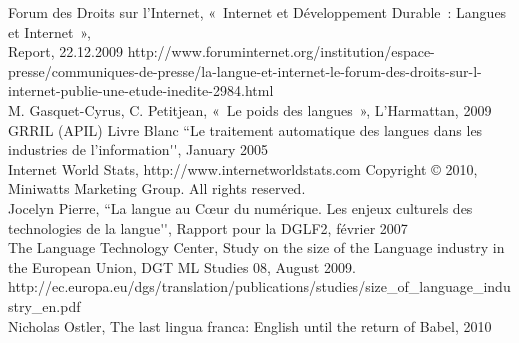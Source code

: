 Forum des Droits sur l’Internet, «~Internet et Développement Durable~: Langues et Internet~»,\\
Report, 22.12.2009 http://www.foruminternet.org/institution/espace-presse/communiques-de-presse/la-langue-et-internet-le-forum-des-droits-sur-l-internet-publie-une-etude-inedite-2984.html\\


M. Gasquet-Cyrus, C. Petitjean, «~Le poids des langues~», L’Harmattan, 2009\\

GRRIL (APIL) Livre Blanc ``Le traitement automatique des langues dans les industries de l’information{\mbox '}{\mbox '}, January 2005\\

Internet World Stats, http://www.internetworldstats.com Copyright © 2010, Miniwatts Marketing Group. All rights reserved.\\

Jocelyn Pierre, ``La langue au Cœur du numérique. Les enjeux culturels des technologies de la langue{\mbox '}{\mbox '}, Rapport pour la DGLF2, février 2007\\

The Language Technology Center, Study on the size of the Language industry in the European Union, DGT ML Studies 08, August 2009. http://ec.europa.eu/dgs/translation/publications/studies/size\_of\_language\_industry\_en.pdf\\

Nicholas Ostler, The last lingua franca: English until the return of Babel, 2010\\



%

  
\cleardoublepage

\label{metanetmembers}

